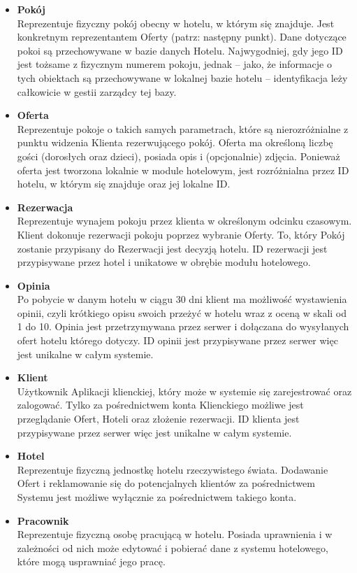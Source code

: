 \documentclass{article}
\begin{document}
\begin{itemize}
    \item \textbf{Pokój}\\
    Reprezentuje fizyczny pokój obecny w hotelu, w którym się znajduje. Jest konkretnym reprezen\-tantem Oferty (patrz: następny punkt). Dane dotyczące pokoi są przechowywane w bazie danych Hotelu. Najwygodniej, gdy jego ID jest tożsame z fizycznym numerem pokoju, jednak – jako, że informacje o tych obiektach są przechowywane w lokalnej bazie hotelu – identyfikacja leży całkowicie w gestii zarządcy tej bazy.
    \item \textbf{Oferta}\\
    Reprezentuje pokoje o takich samych parametrach, które są nierozróżnialne z punktu widzenia Klienta rezerwującego pokój. Oferta ma określoną liczbę gości (dorosłych oraz dzieci), posiada opis i (opcjonalnie) zdjęcia.
    Ponieważ oferta jest tworzona lokalnie w module hotelowym, jest rozróżnialna przez ID hotelu, w którym się znajduje oraz jej lokalne ID.
    \item \textbf{Rezerwacja}\\
    Reprezentuje wynajem pokoju przez klienta w określonym odcinku czasowym. Klient dokonuje rezerwacji pokoju poprzez wybranie Oferty. To, który Pokój zostanie przypisany do Rezerwacji jest decyzją hotelu.
    ID rezerwacji jest przypisywane przez hotel i unikatowe w obrębie modułu hotelowego.
    \item \textbf{Opinia}\\
    Po pobycie w danym hotelu w ciągu 30 dni klient ma możliwość wystawienia opinii, czyli krótkiego opisu swoich przeżyć w hotelu wraz z oceną w skali od 1 do 10. Opinia jest przetrzy\-mywana przez serwer i dołączana do wysyłanych ofert hotelu którego dotyczy.
    ID opinii jest przypisywane przez serwer więc jest unikalne w całym systemie.
    \item \textbf{Klient}\\
    Użytkownik Aplikacji klienckiej, który może w systemie się zarejestrować oraz zalogować. Tylko za pośrednictwem konta Klienckiego możliwe jest przeglądanie Ofert, Hoteli oraz złożenie rezerwacji.
    ID klienta jest przypisywane przez serwer więc jest unikalne w całym systemie.
    \item \textbf{Hotel}\\
    Reprezentuje fizyczną jednostkę hotelu rzeczywistego świata. Dodawanie Ofert i reklamowanie się do potencjalnych klientów za pośrednic\-twem Systemu jest możliwe wyłącznie za pośrednictwem takiego konta.
    \item \textbf{Pracownik}\\
    Reprezentuje fizyczną osobę pracującą w hotelu. Posiada uprawnienia i w zależności od nich może edytować i pobierać dane z systemu hotelowego, które mogą usprawniać jego pracę.
\end{itemize}
\end{document}
